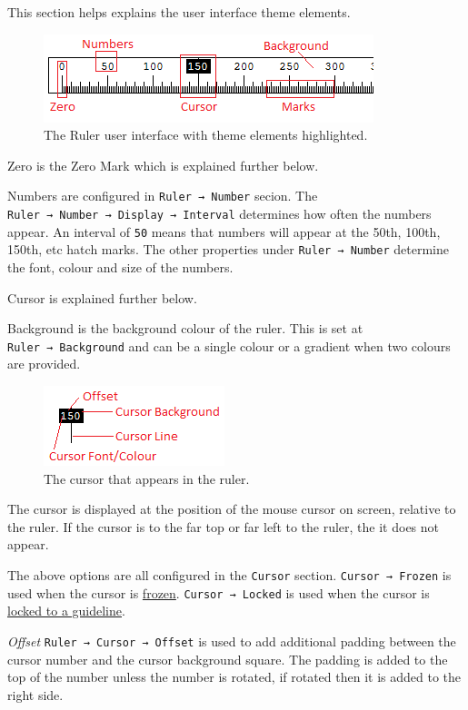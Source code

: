 \documentclass[
]{book}
\begin{document}
This section helps explains the user interface theme elements.

\begin{figure}
\centering
\includegraphics{images/ruler-theme.png}
\caption{\label{fig:unnamed-chunk-8}The Ruler user interface with theme elements highlighted.}
\end{figure}

Zero is the Zero Mark which is explained further below.

Numbers are configured in \texttt{Ruler\ →\ Number} secion.
The \texttt{Ruler\ →\ Number\ →\ Display\ →\ Interval} determines how often the numbers appear.
An interval of \texttt{50} means that numbers will appear at the 50th, 100th, 150th, etc hatch marks.
The other properties under \texttt{Ruler\ →\ Number} determine the font, colour and size of the numbers.

Cursor is explained further below.

Background is the background colour of the ruler.
This is set at \texttt{Ruler\ →\ Background} and can be a single colour or a gradient when two colours are provided.

\begin{figure}
\centering
\includegraphics{images/ruler-cursor.png}
\caption{\label{fig:unnamed-chunk-9}The cursor that appears in the ruler.}
\end{figure}

The cursor is displayed at the position of the mouse cursor on screen, relative to the ruler.
If the cursor is to the far top or far left to the ruler, the it does not appear.

The above options are all configured in the \texttt{Cursor} section.
\texttt{Cursor\ →\ Frozen} is used when the cursor is \hyperref[freeze]{frozen}.
\texttt{Cursor\ →\ Locked} is used when the cursor is \hyperref[guideline-locked]{locked to a guideline}.

\emph{Offset} \texttt{Ruler\ →\ Cursor\ →\ Offset} is used to add additional padding between the cursor number and the cursor background square.
The padding is added to the top of the number unless the number is rotated, if rotated then it is added to the right side.
\end{document}
